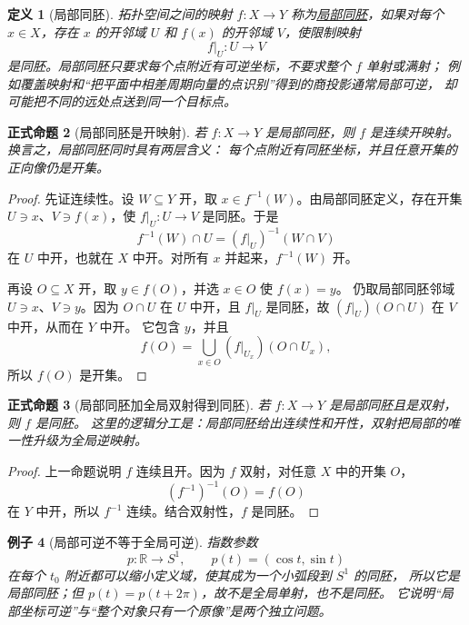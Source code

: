 \documentclass[UTF8,fontset=none,a4paper,11pt]{ctexart}
\theoremstyle{foundation-definition}
\newtheorem{definition}{定义}[section]
\theoremstyle{foundation-theorem}
\theoremstyle{foundation-proposition}
\newtheorem{proposition}[definition]{正式命题}
\theoremstyle{foundation-example}
\newtheorem{example}[definition]{例子}
\theoremstyle{foundation-remark}
\theoremstyle{foundation-theorem}
\newcommand{\term}[2]{\hyperref[#1]{#2}}
\begin{document}
\begin{definition}[局部同胚]\label{def:local-homeomorphism}
拓扑空间之间的映射 \(f:X\to Y\) 称为\term{def:local-homeomorphism}{局部同胚}，如果对每个
\(x\in X\)，存在 \(x\) 的开邻域 \(U\) 和 \(f(x)\) 的开邻域 \(V\)，使限制映射
\[
f|_U:U\longrightarrow V
\]
是同胚。局部同胚只要求每个点附近有可逆坐标，不要求整个 \(f\) 单射或满射；
例如覆盖映射和“把平面中相差周期向量的点识别”得到的商投影通常局部可逆，
却可能把不同的远处点送到同一个目标点。
\end{definition}

\begin{proposition}[局部同胚是开映射]\label{prop:local-homeomorphism-open}
若 \(f:X\to Y\) 是局部同胚，则 \(f\) 是连续开映射。换言之，局部同胚同时具有两层含义：
每个点附近有同胚坐标，并且任意开集的正向像仍是开集。
\end{proposition}

\begin{proof}
先证连续性。设 \(W\subseteq Y\) 开，取 \(x\in f^{-1}(W)\)。由局部同胚定义，存在开集
\(U\ni x\)、\(V\ni f(x)\)，使 \(f|_U:U\to V\) 是同胚。于是
\[
 f^{-1}(W)\cap U=(f|_U)^{-1}(W\cap V)
\]
在 \(U\) 中开，也就在 \(X\) 中开。对所有 \(x\) 并起来，\(f^{-1}(W)\) 开。

再设 \(O\subseteq X\) 开，取 \(y\in f(O)\)，并选 \(x\in O\) 使 \(f(x)=y\)。
仍取局部同胚邻域 \(U\ni x\)、\(V\ni y\)。因为 \(O\cap U\) 在 \(U\) 中开，且
\(f|_U\) 是同胚，故 \((f|_U)(O\cap U)\) 在 \(V\) 中开，从而在 \(Y\) 中开。
它包含 \(y\)，并且
\[
f(O)=\bigcup_{x\in O}(f|_{U_x})(O\cap U_x),
\]
所以 \(f(O)\) 是开集。\end{proof}

\begin{proposition}[局部同胚加全局双射得到同胚]\label{prop:local-homeomorphism-bijection-homeomorphism}
若 \(f:X\to Y\) 是局部同胚且是双射，则 \(f\) 是同胚。
这里的逻辑分工是：局部同胚给出连续性和开性，双射把局部的唯一性升级为全局逆映射。
\end{proposition}

\begin{proof}
上一命题说明 \(f\) 连续且开。因为 \(f\) 双射，对任意 \(X\) 中的开集 \(O\)，
\[
(f^{-1})^{-1}(O)=f(O)
\]
在 \(Y\) 中开，所以 \(f^{-1}\) 连续。结合双射性，\(f\) 是同胚。\end{proof}

\begin{example}[局部可逆不等于全局可逆]
指数参数
\[
p:\mathbb R\longrightarrow S^1,\qquad p(t)=(\cos t,\sin t)
\]
在每个 \(t_0\) 附近都可以缩小定义域，使其成为一个小弧段到 \(S^1\) 的同胚，
所以它是局部同胚；但 \(p(t)=p(t+2\pi)\)，故不是全局单射，也不是同胚。
它说明“局部坐标可逆”与“整个对象只有一个原像”是两个独立问题。
\end{example}
\end{document}
